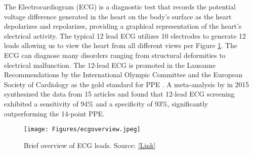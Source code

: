 \documentclass[
	a4paper, 
	10pt, 
	twoside, 
]{LTJournalArticle}
\begin{document}
The Electrocardiogram (ECG) is a diagnostic test that records the potential voltage difference generated in the heart on the body’s surface as the heart depolarizes and repolarizes, providing a graphical representation of the heart's electrical activity. The typical 12 lead ECG utilizes 10 electrodes to generate 12 leads allowing us to view the heart from all different views per Figure \ref{fig:ecgoverview}. The ECG can diagnose many disorders ranging from structural deformities to electrical malfunction. The 12-lead ECG is promoted in the Lausanne Recommendations by the International Olympic Committee and the European Society of Cardiology as the gold standard for PPE \cite{Maron2014}. A meta-analysis by \textcite{Harmon2015} in 2015 synthesized the data from 15 articles and found that 12-lead ECG screening exhibited a sensitivity of 94\% and a specificity of 93\%, significantly outperforming the 14-point PPE. 

\begin{figure}[!h]
    \centering
    \texttt{[image: Figures/ecgoverview.jpeg]}
    \caption{Brief overview of ECG leads. Source: \href{https://link.springer.com/chapter/10.1007/978-3-030-40341-6_2}{[Link]}}
    \label{fig:ecgoverview}
\end{figure}
\end{document}
